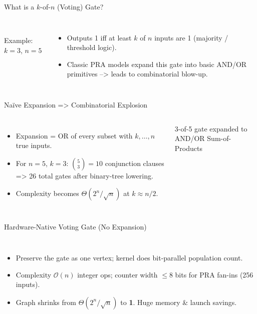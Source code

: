 \begin{frame}[t]{What is a $k$-of-$n$ (Voting) Gate?}
  \begin{columns}
      \centering
    
      \\[-4pt] \scriptsize Example: $k=3$, $n=5$
      \begin{itemize}[<+->]
        \item Outputs 1 iff at least $k$ of $n$ inputs are 1 (majority / threshold logic).
        \item Classic PRA models expand this gate into basic AND/OR primitives --> leads to combinatorial blow-up.
      \end{itemize}
  \end{columns}
\end{frame}

\begin{frame}[t]{Naïve Expansion => Combinatorial Explosion}
  \begin{columns}
      \begin{itemize}[<+->]
        \item Expansion = OR of every subset with $k,\dots,n$ true inputs.
        \item For $n=5$, $k=3$: $\binom{5}{3}=10$ conjunction clauses => 26 total gates after binary-tree lowering.
        \item Complexity becomes $\Theta(2^{n}/\sqrt{n})$ at $k\approx n/2$.
      \end{itemize}
      \centering
      
      \scriptsize 3-of-5 gate expanded to AND/OR Sum-of-Products
  \end{columns}
\end{frame}

\begin{frame}[t]{Hardware-Native Voting Gate (No Expansion)}
  \begin{columns}
      \begin{itemize}[<+->]
        \item Preserve the gate as one vertex; kernel does bit-parallel population count.
        \item Complexity $\mathcal{O}(n)$ integer ops; counter width $\le 8$ bits for PRA fan-ins (256 inputs).
        \item Graph shrinks from $\Theta(2^{n}/\sqrt{n})$ to \textbf{1}. Huge memory & launch savings.
      \end{itemize}
      \centering
  \end{columns}
\end{frame}